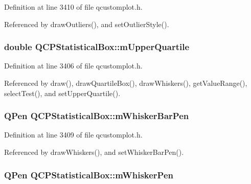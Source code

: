 Definition at line 3410 of file qcustomplot.\+h.



Referenced by draw\+Outliers(), and set\+Outlier\+Style().

\hypertarget{class_q_c_p_statistical_box_a865afbcca332ee851aa45807381bc80e}{}
\subsubsection[{m\+Upper\+Quartile}]{\setlength{\rightskip}{0pt plus 5cm}double Q\+C\+P\+Statistical\+Box\+::m\+Upper\+Quartile\hspace{0.3cm}{\ttfamily [protected]}}\label{class_q_c_p_statistical_box_a865afbcca332ee851aa45807381bc80e}


Definition at line 3406 of file qcustomplot.\+h.



Referenced by draw(), draw\+Quartile\+Box(), draw\+Whiskers(), get\+Value\+Range(), select\+Test(), and set\+Upper\+Quartile().

\hypertarget{class_q_c_p_statistical_box_aa719b1d722a9f82364df1497a6dc1da8}{}
\subsubsection[{m\+Whisker\+Bar\+Pen}]{\setlength{\rightskip}{0pt plus 5cm}Q\+Pen Q\+C\+P\+Statistical\+Box\+::m\+Whisker\+Bar\+Pen\hspace{0.3cm}{\ttfamily [protected]}}\label{class_q_c_p_statistical_box_aa719b1d722a9f82364df1497a6dc1da8}


Definition at line 3409 of file qcustomplot.\+h.



Referenced by draw\+Whiskers(), and set\+Whisker\+Bar\+Pen().

\hypertarget{class_q_c_p_statistical_box_a25b7552499f0f090fcff02858b2265a5}{}
\subsubsection[{m\+Whisker\+Pen}]{\setlength{\rightskip}{0pt plus 5cm}Q\+Pen Q\+C\+P\+Statistical\+Box\+::m\+Whisker\+Pen\hspace{0.3cm}{\ttfamily [protected]}}\label{class_q_c_p_statistical_box_a25b7552499f0f090fcff02858b2265a5}


